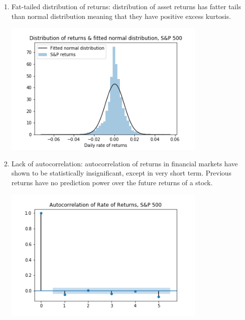 \begin{enumerate}
    \item Fat-tailed distribution of returns: distribution of asset returns has fatter tails than normal distribution meaning that they have positive excess kurtosis. 
    \par
    \begin{minipage}{\linewidth}
        \centering
        \includegraphics[width=10cm]{plots/S&P500_fat_tails.png}
        \label{fig:sp_fat_tails}
    \end{minipage}
    \item Lack of autocorrelation: autocorrelation of returns in financial markets have shown to be statistically insignificant, except in very short term. Previous returns have no prediction power over the future returns of a stock. 
    \par
    \begin{minipage}{\linewidth}
        \centering
        \includegraphics[width=10cm]{plots/S&P500_autocorr.png}

\end{minipage}
\end{enumerate}

